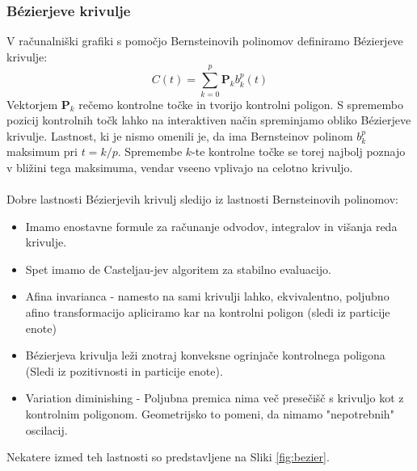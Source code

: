\documentclass{article}
\begin{document}
\subsubsection{Bézierjeve krivulje}
V računalniški grafiki s pomočjo Bernsteinovih polinomov definiramo Bézierjeve krivulje:
\begin{equation}
C(t) = \sum_{k=0}^p \textbf{P}_k b_k^p (t)
\end{equation}
Vektorjem $\textbf{P}_k$ rečemo kontrolne točke in tvorijo kontrolni poligon. S spremembo pozicij kontrolnih točk lahko na interaktiven način spreminjamo obliko Bézierjeve krivulje. Lastnost, ki je nismo omenili je, da ima Bernsteinov polinom $b_k^p$ maksimum pri $t=k/p$. Spremembe $k$-te kontrolne točke se torej najbolj poznajo v bližini tega maksimuma, vendar vseeno vplivajo na celotno krivuljo.
\\
\\
Dobre lastnosti Bézierjevih krivulj sledijo iz lastnosti Bernsteinovih polinomov:
\begin{itemize}
\item Imamo enostavne formule za računanje odvodov, integralov in višanja reda krivulje.
\item Spet imamo de Casteljau-jev algoritem za stabilno evaluacijo.
\item Afina invarianca - namesto na sami krivulji lahko, ekvivalentno, poljubno afino transformacijo apliciramo kar na kontrolni poligon (sledi iz particije enote)
\item Bézierjeva krivulja leži znotraj konveksne ogrinjače kontrolnega poligona (Sledi iz pozitivnosti in particije enote).
\item Variation diminishing - Poljubna premica nima več presečišč s krivuljo kot z kontrolnim poligonom. Geometrijsko to pomeni, da nimamo "nepotrebnih" oscilacij.
\end{itemize}

Nekatere izmed teh lastnosti so predstavljene na Sliki \ref{fig:bezier}.
\end{document}
